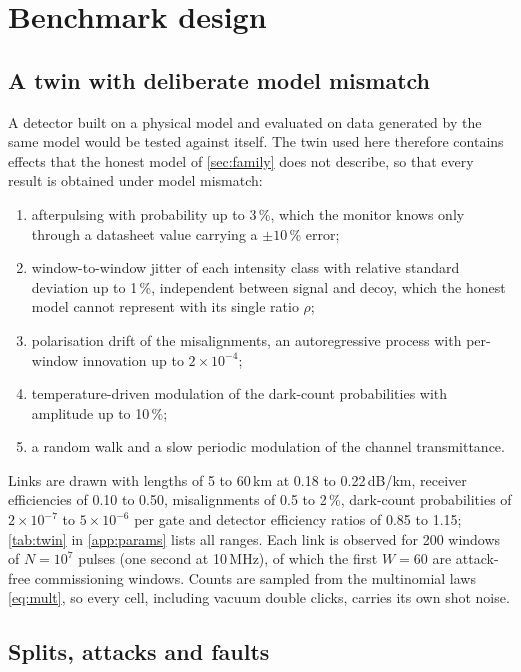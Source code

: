 \section{Benchmark design}\label{sec:benchmark}

\subsection{A twin with deliberate model mismatch}\label{sec:twin}

A detector built on a physical model and evaluated on data generated by the same model would be tested against itself. The twin used here therefore contains effects that the honest model of \cref{sec:family} does not describe, so that every result is obtained under model mismatch:
\begin{enumerate}[label=(\alph*)]
\item afterpulsing with probability up to 3\,\%, which the monitor knows only through a datasheet value carrying a $\pm10$\,\% error;
\item window-to-window jitter of each intensity class with relative standard deviation up to 1\,\%, independent between signal and decoy, which the honest model cannot represent with its single ratio $\rho$;
\item polarisation drift of the misalignments, an autoregressive process with per-window innovation up to $2\times10^{-4}$;
\item temperature-driven modulation of the dark-count probabilities with amplitude up to 10\,\%;
\item a random walk and a slow periodic modulation of the channel transmittance.
\end{enumerate}
Links are drawn with lengths of 5 to 60\,km at 0.18 to 0.22\,dB/km, receiver efficiencies of 0.10 to 0.50, misalignments of 0.5 to 2\,\%, dark-count probabilities of $2\times10^{-7}$ to $5\times10^{-6}$ per gate and detector efficiency ratios of 0.85 to 1.15; \cref{tab:twin} in \cref{app:params} lists all ranges. Each link is observed for 200 windows of $N=10^7$ pulses (one second at 10\,MHz), of which the first $W=60$ are attack-free commissioning windows. Counts are sampled from the multinomial laws \eqref{eq:mult}, so every cell, including vacuum double clicks, carries its own shot noise.

\subsection{Splits, attacks and faults}\label{sec:splits}

